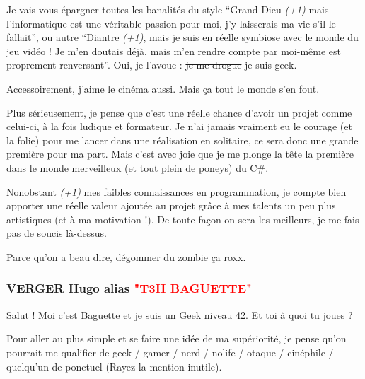 \documentclass{article}
\begin{document}
\par
Je vais vous épargner toutes les banalités du style “Grand Dieu \emph{(+1)} mais l’informatique est une véritable passion pour moi, j’y laisserais ma vie s’il le fallait”, ou autre “Diantre \emph{(+1)}, mais je suis en réelle symbiose avec le monde du jeu vidéo ! Je m’en doutais déjà, mais m’en rendre compte par moi-même est proprement renversant”. Oui, je l’avoue : \st{je me drogue}  je suis geek.
\newline

\par
Accessoirement, j’aime le cinéma aussi. Mais ça tout le monde s’en fout.
\newline

\par
Plus sérieusement, je pense que c’est une réelle chance d’avoir un projet comme celui-ci, à la fois ludique et formateur. Je n’ai jamais vraiment eu le courage (et la folie) pour me lancer dans une réalisation en solitaire, ce sera donc une grande première pour ma part. Mais c’est avec joie que je me plonge la tête la première dans le monde merveilleux (et tout plein de poneys) du C\#.
\newline

\par
Nonobstant \emph{(+1)} mes faibles connaissances en programmation, je compte bien apporter une réelle valeur ajoutée au projet grâce à mes talents un peu plus artistiques (et à ma motivation !). De toute façon on sera les meilleurs, je me fais pas de soucis là-dessus.
\newline

\par
Parce qu’on a beau dire, dégommer du zombie ça roxx.
\newline

\subsubsection{VERGER Hugo alias \textcolor{red}{"T3H BAGUETTE"}}

\par
Salut ! Moi c'est Baguette et je suis un Geek niveau 42. Et toi à quoi tu joues ?
\newline

\par
Pour aller au plus simple et se faire une idée de ma supériorité, je pense qu'on pourrait me qualifier de geek / gamer / nerd / nolife / otaque / cinéphile / quelqu'un de ponctuel (Rayez la mention inutile).
\newline
\end{document}
